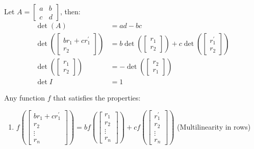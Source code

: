 \documentclass[11pt]{article}
\begin{document}
\begin{theorem}
    Let $A = \begin{bmatrix} a & b \\ c & d \end{bmatrix}$, then:
    \begin{align}
        \det(A) &= ad - bc \\
        \det\left(\begin{bmatrix}
            br_1 + cr_1^\prime \\ r_2
        \end{bmatrix}\right) &= b\det\left(\begin{bmatrix}
            r_1 \\ r_2
        \end{bmatrix}\right) + c\det\left(\begin{bmatrix}
            r_1^\prime \\ r_2 
        \end{bmatrix}\right) \\
        \det\left(\begin{bmatrix}
            r_1 \\ r_2
        \end{bmatrix}\right) &= -\det\left(\begin{bmatrix}
            r_2 \\ r_1
        \end{bmatrix}\right) \\ 
        \det I &= 1
\end{align}
\begin{definition}
    Any function $f$ that satisfies the properties:
    \begin{enumerate}
        \item $f\left(\begin{bmatrix}
            br_1 + cr_1^\prime \\ r_2 \\ \vdots \\ r_n
        \end{bmatrix}\right) = bf\left(\begin{bmatrix}
            r_1 \\ r_2 \\ \vdots \\ r_n
        \end{bmatrix}\right) + cf\left(\begin{bmatrix}
            r_1^\prime \\ r_2 \\ \vdots \\ r_n
        \end{bmatrix}\right)$ (Multilinearity in rows)
        

\end{enumerate}
\end{definition}
\end{theorem}
\end{document}
